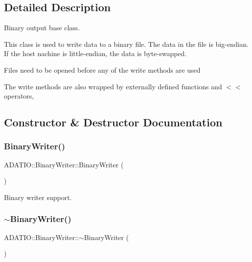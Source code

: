 \subsection{Detailed Description}
Binary output base class. 

This class is used to write data to a binary file. The data in the file is big-\/endian. If the host nachine is little-\/endian, the data is byte-\/swapped.

Files need to be opened before any of the write methods are used

The write methods are also wrapped by externally defined functions and $<$$<$ operators, 

\subsection{Constructor \& Destructor Documentation}
\mbox{\label{classADATIO_1_1BinaryWriter_ab3eb202f6fb06059cf4dd2eba12280cf}} 
\subsubsection{\texorpdfstring{BinaryWriter()}{BinaryWriter()}\hspace{0.1cm}{\footnotesize\ttfamily [1/2]}}
{\footnotesize\ttfamily A\+D\+A\+T\+I\+O\+::\+Binary\+Writer\+::\+Binary\+Writer (\begin{DoxyParamCaption}{ }\end{DoxyParamCaption})}



Binary writer support. 

\mbox{\label{classADATIO_1_1BinaryWriter_aa4dca0f30a7074695f62209660131fbf}} 
\subsubsection{\texorpdfstring{$\sim$BinaryWriter()}{~BinaryWriter()}\hspace{0.1cm}{\footnotesize\ttfamily [1/2]}}
{\footnotesize\ttfamily A\+D\+A\+T\+I\+O\+::\+Binary\+Writer\+::$\sim$\+Binary\+Writer (\begin{DoxyParamCaption}{ }\end{DoxyParamCaption})\hspace{0.3cm}{\ttfamily [virtual]}}

